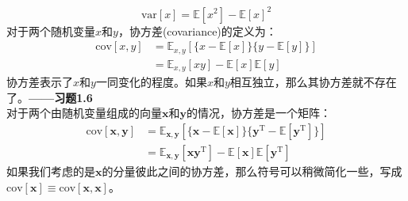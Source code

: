 \documentclass[b5paper]{book}
\numberwithin{equation}{chapter}
\begin{document}
{\begin{equation}
		\mathrm{var}[x]=\mathbb{E}[x^2]-\mathbb{E}[x]^2
	\end{equation}
	\indent 对于两个随机变量$x$和$y$，协方差(covariance)的定义为：
	\begin{equation}
		\begin{split}
			\mathrm{cov}[x,y] &= \mathbb{E}_{x,y}[\{x-\mathbb{E}[x]\}\{y-\mathbb{E}[y]\}] \\
							&= \mathbb{E}_{x,y}[xy]-\mathbb{E}[x]\mathbb{E}[y]
		\end{split}
	\end{equation}
	\indent 协方差表示了$x$和$y$一同变化的程度。如果$x$和$y$相互独立，那么其协方差就不存在了。\color{red}\textbf{——习题1.6}\color{black}\\
	\indent 对于两个由随机变量组成的向量$\mathbf{x}$和$\mathbf{y}$的情况，协方差是一个矩阵：
	\begin{equation}
		\begin{split}
			\mathrm{cov}[\mathbf{x,y}] &= \mathbb{E}_{\mathbf{x,y}}[\{\mathbf{x}-\mathbb{E}[\mathbf{x}]\}\{\mathbf{y}^\mathrm{T}-\mathbb{E}[\mathbf{y}^\mathrm{T}]\}] \\
			&= \mathbb{E}_{\mathbf{x,y}}[\mathbf{xy^\mathrm{T}}]-\mathbb{E}[\mathbf{x}]\mathbb{E}[\mathbf{y}^\mathrm{T}]
		\end{split}
	\end{equation}
	\indent 如果我们考虑的是$\mathbf{x}$的分量彼此之间的协方差，那么符号可以稍微简化一些，写成$\mathrm{cov}[\mathbf{x}] \equiv \mathrm{cov}[\mathbf{x,x}]$。}
\end{document}
